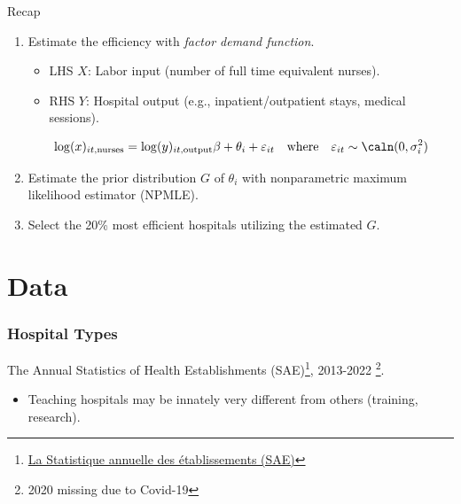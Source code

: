 \documentclass[10pt, aspectratio=169]{beamer}
\begin{document}
\begin{frame}{Recap}
  \begin{enumerate}\itemsep=12pt
    \item \alert{Estimate the efficiency} with \textit{factor demand function}.
          \begin{itemize} \itemsep=8pt
            \item LHS $X$: Labor input (number of full time equivalent nurses).
            \item RHS $Y$: Hospital output (e.g., inpatient/outpatient stays, medical sessions).
          \end{itemize}
          \begin{equation*}
            \log(x)_{it,\text{nurses}} = \log(y)_{it,\text{output}}\beta +\theta_i +\varepsilon_{it} \quad \text{where}\quad \varepsilon_{it} \sim \caln(0,\sigma_i^2)
          \end{equation*}
    \item \alert{Estimate the prior distribution $G$ of $\theta_i$} with nonparametric maximum likelihood estimator (NPMLE).
    \item \alert{Select the 20\% most efficient hospitals} utilizing the estimated $G$.
  \end{enumerate}
\end{frame}

\section{Data}

\begin{frame}
  \frametitle{Hospital Types}
  The Annual Statistics of Health
  Establishments
  (SAE)\footnote{\href{https://data.drees.solidarites-sante.gouv.fr/explore/dataset/708_bases-statistiques-sae/information/}{La
      Statistique annuelle des établissements (SAE)}}, 2013-2022 \footnote{2020 missing due to Covid-19}.
  \begin{table}

    \begin{adjustbox}{width=0.8\textwidth,center}
      \centering
      
    \end{adjustbox}
    \begin{itemize}\itemsep = 8pt
      \item Teaching hospitals may be innately very different from others (training,
            research).
    \end{itemize}
  \end{table}
\end{frame}
\end{document}
